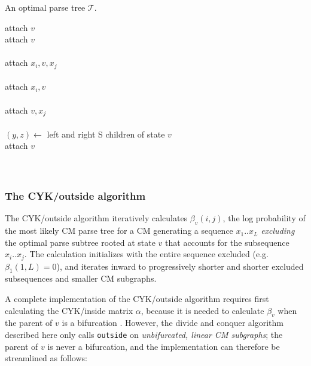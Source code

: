 \documentclass[11pt]{article}
\begin{document}
\begin{algorithm}
         {An optimal parse tree $\mathcal{T}$.}
\begin{algtab*}
    attach $v$\\
    attach $v$ \\
    \\
    attach $x_i,v,x_j$\\
    \\
    attach $x_i,v$\\
    \\
    attach $v,x_j$\\
    \\
    $(y,z) \leftarrow $ left and right S children of state $v$\\
    attach $v$\\
    \\
    \\
\algend
\end{algtab*}
\end{algorithm}

\subsubsection{The CYK/outside algorithm}

The CYK/outside algorithm iteratively calculates $\beta_v(i,j)$, the
log probability of the most likely CM parse tree for a CM generating a
sequence $x_1..x_L$ \emph{excluding} the optimal parse subtree rooted
at state $v$ that accounts for the subsequence $x_i..x_j$. The
calculation initializes with the entire sequence excluded (e.g.
$\beta_1(1,L) = 0$), and iterates inward to progressively shorter and
shorter excluded subsequences and smaller CM subgraphs.

A complete implementation of the CYK/outside algorithm requires first
calculating the CYK/inside matrix $\alpha$, because it is needed to
calculate $\beta_v$ when the parent of $v$ is a bifurcation
\cite{Lari90,Lari91,Durbin98}. However, the divide and conquer
algorithm described here only calls \texttt{outside} on
\emph{unbifurcated, linear CM subgraphs}; the parent of $v$ is never a
bifurcation, and the implementation can therefore be streamlined as
follows:
\end{document}
